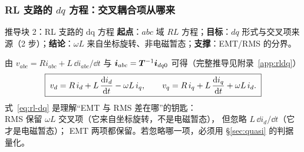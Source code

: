 \subsubsection{RL 支路的 $dq$ 方程：交叉耦合项从哪来}
\begin{derivblock}{推导块 2：RL 支路的 dq 方程}
\textbf{起点}：$abc$ 域 $RL$ 方程；\textbf{目标}：$dq$ 形式与交叉项来源（2 步）；\textbf{结论}：$\omega L$ 来自坐标旋转、非电磁暂态；\textbf{支撑}：EMT/RMS 的分界。



由 $v_{abc}=Ri_{abc}+L\,\dd i_{abc}/\dd t$ 与 $\bm i_{abc}=\bm{T}^{-1}\bm i_{dq0}$ 可得（完整推导见附录~\ref{app:rldq}）
\begin{equation}
\boxed{\;
v_d=R\,i_d+L\,\frac{\mathrm{d} i_d}{\mathrm{d} t}-\omega L\,i_q,\qquad
v_q=R\,i_q+L\,\frac{\mathrm{d} i_q}{\mathrm{d} t}+\omega L\,i_d .\;}
\label{eq:rl-dq}
\end{equation}
式~\eqref{eq:rl-dq} 是理解“EMT 与 RMS 差在哪”的钥匙：\\
RMS 保留 $\omega L$ 交叉项（它来自坐标旋转，不是电磁暂态），
但忽略 $L\,\dd i_d/\dd t$（它才是电磁暂态）；
EMT 两项都保留。若忽略哪一项，必须用 \S\ref{sec:quasi} 的判据量化。


\end{derivblock}

